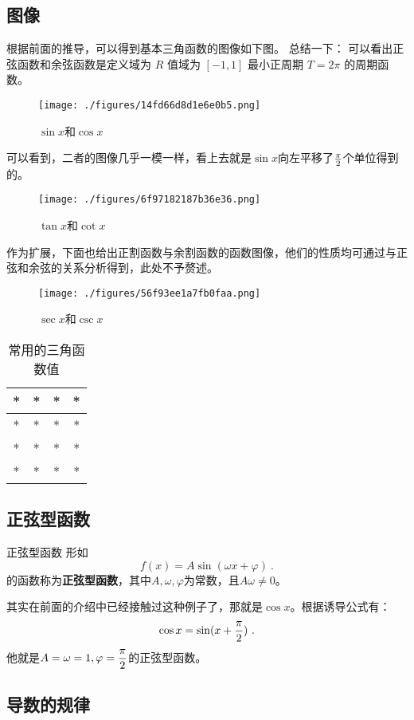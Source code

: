 \subsection{图像}
根据前面的推导，可以得到基本三角函数的图像如下图。
总结一下：
可以看出正弦函数和余弦函数是定义域为 $R$ 值域为 $[-1,1]$ 最小正周期 $T = 2\pi$ 的周期函数。

\begin{figure}[ht]
\centering
\texttt{[image: ./figures/14fd66d8d1e6e0b5.png]}
\caption{$\sin x$和$\cos x$} \label{fig_HsTFFv_1}
\end{figure}

可以看到，二者的图像几乎一模一样，看上去就是$\sin x$向左平移了${\pi\over2}$个单位得到的。

\begin{figure}[ht]
\centering
\texttt{[image: ./figures/6f97182187b36e36.png]}
\caption{$\tan x$和$\cot x$} \label{fig_HsTFFv_3}
\end{figure}

作为扩展，下面也给出正割函数与余割函数的函数图像，他们的性质均可通过与正弦和余弦的关系分析得到，此处不予赘述。

\begin{figure}[ht]
\centering
\texttt{[image: ./figures/56f93ee1a7fb0faa.png]}
\caption{$\sec x$和$\csc x$} \label{fig_HsTFFv_2}
\end{figure}

\begin{table}[ht]
\centering
\caption{常用的三角函数值}\label{tab_HsTFFv1}
\begin{tabular}{|c|c|c|c|}
\hline
* & * & * & * \\
\hline
* & * & * & * \\
\hline
* & * & * & * \\
\hline
* & * & * & * \\
\hline
\end{tabular}
\end{table}

\subsection{正弦型函数}

\begin{definition}{正弦型函数}
形如
\begin{equation}
f(x)=A\sin(\omega x+\varphi)~.
\end{equation}
的函数称为\textbf{正弦型函数}，其中$A,\omega,\varphi$为常数，且$A\omega\neq0$。
\end{definition}
其实在前面的介绍中已经接触过这种例子了，那就是$\cos x$。根据诱导公式有：
\begin{equation}
\cos x=\sin(x+{\pi\over2})~.
\end{equation}
他就是$\displaystyle A=\omega=1,\varphi={\pi\over2}$的正弦型函数。


\subsection{导数的规律}